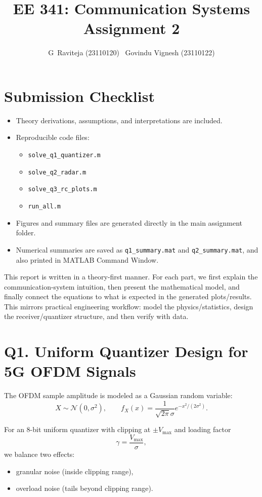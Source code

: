 \documentclass{article}
\title{\hspace*{1.5cm}\textbf{EE 341: Communication Systems \newline Assignment 2}}
\author{G\ Raviteja (23110120) \ Govindu Vignesh (23110122)}
\date{}
\begin{document}
\maketitle

\section*{Submission Checklist}
\begin{itemize}
\item[$\rightarrow$] Theory derivations, assumptions, and interpretations are included.
\item[$\rightarrow$] Reproducible code files:
\begin{itemize}
\item \texttt{solve\_q1\_quantizer.m}
\item \texttt{solve\_q2\_radar.m}
\item \texttt{solve\_q3\_rc\_plots.m}
\item \texttt{run\_all.m}
\end{itemize}
\item[$\rightarrow$] Figures and summary files are generated directly in the main assignment folder.
\item[$\rightarrow$] Numerical summaries are saved as \texttt{q1\_summary.mat} and \texttt{q2\_summary.mat}, and also printed in MATLAB Command Window.
\end{itemize}

This report is written in a theory-first manner. For each part, we first explain the communication-system intuition, then present the mathematical model, and finally connect the equations to what is expected in the generated plots/results. This mirrors practical engineering workflow: model the physics/statistics, design the receiver/quantizer structure, and then verify with data.

\section{Q1. Uniform Quantizer Design for 5G OFDM Signals}

The OFDM sample amplitude is modeled as a Gaussian random variable:
\begin{equation*}
X \sim \mathcal{N}(0,\sigma^2), \qquad
f_X(x)=\frac{1}{\sqrt{2\pi}\sigma}e^{-x^2/(2\sigma^2)}.
\end{equation*}

For an 8-bit uniform quantizer with clipping at $\pm V_{\max}$ and loading factor
\begin{equation*}
\gamma = \frac{V_{\max}}{\sigma},
\end{equation*}
we balance two effects:
\begin{itemize}
\item[$\rightarrow$] granular noise (inside clipping range),
\item[$\rightarrow$] overload noise (tails beyond clipping range).
\end{itemize}
\end{document}
